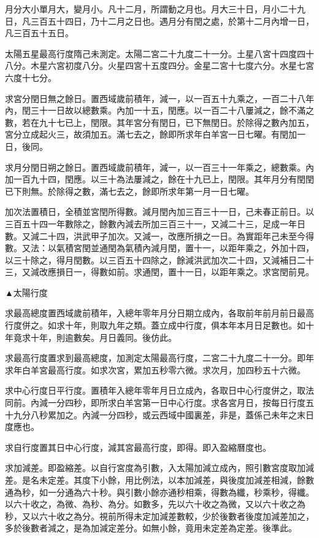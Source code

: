 月分大小單月大，變月小。凡十二月，所謂動之月也。月大三十日，月小二十九日，凡三百五十四日，乃十二月之日也。遇月分有閏之處，於第十二月內增一日，凡三百五十五日。

太陽五星最高行度隋己未測定。太陽二宮二十九度二十一分。土星八宮十四度四十八分。木星六宮初度八分。火星四宮十五度四分。金星二宮十七度六分。水星七宮六度十七分。

求宮分閏日無之餘日。置西域歲前積年，減一，以一百五十九乘之，一百二十八年內，閏三十一日故以總數乘。內加一十五，閏應。以一百二十八屢減之，餘不滿之數，若在九十七已上，閏限。其年宮分有閏日，已下無閏日。於除得之數內加五，宮分立成起火三，故須加五。滿七去之，餘即所求年白羊宮一日七曜。有閏加一日，後同。

求月分閏日朔之餘日。置西域歲前積年，減一，以一百三十一年乘之，總數乘。內加一百九十四，閏應。以三十為法屢減之，餘在十九已上，閏限。其年月分有閏閏已下則無。於除得之數，滿七去之，餘即所求年第一月一日七曜。

加次法置積日，全積並宮閏所得數。減月閏內加三百三十一日，己未春正前日。以三百五十四一年數除之，餘數內減去所加三百三十一，又減二十三，足成一年日數。又減二十四，洪武甲子加次。又減一，改應所損之一日。為實距年己未至今得數。又法：以氣積宮閏並通閏為氣積內減月閏，置十一，以距年乘之，外加十四，以三十除之，得月閏數。以三百五十四除之，餘減洪武加次二十四，又減補日二十三，又減改應損日一，得數如前。求通閏，置十一日，以距年乘之。求宮閏前見。

▲太陽行度

求最高總度置西域歲前積年，入總年零年月分日期立成內，各取前年前月前日最高行度併之。如求十年，則取九年之類。蓋立成中行度，俱本年本月日足數也。如十年竟求十年，則逾數矣。月日義同。後仿此。

求最高行度置求到最高總度，加測定太陽最高行度，二宮二十九度二十一分。即年求年白羊宮最高行度。如求次宮，累加五秒零六微。求次月，加四秒五十六微。

求中心行度日平行度。置積年入總年零年月日立成內，各取日中心行度併之，取法同前。內減一分四秒，即所求白羊宮第一日中心行度。求各宮月日，按每日行度五十九分八秒累加之。內減一分四秒，或云西域中國裏差，非是，蓋係己未年之末日度應也。

求自行度置其日中心行度，減其宮最高行度，即得。即入盈縮曆度也。

求加減差。即盈縮差。以自行宮度為引數，入太陽加減立成內，照引數宮度取加減差。是名未定差。其度下小餘，用比例法，以本加減差，與後度加減差相減，餘數通為秒，如一分通為六十秒。與引數小餘亦通秒相乘，得數為纖，秒乘秒，得纖。以六十收之，為微、為秒、為分。如數多，先以六十收之為微，又以六十收之為秒，又以六十收之為分。視前所得未定加減差數較，少於後數者後度加減差加之，多於後數者減之，是為加減定差分。如無小餘，竟用未定差為定差。後準此。


